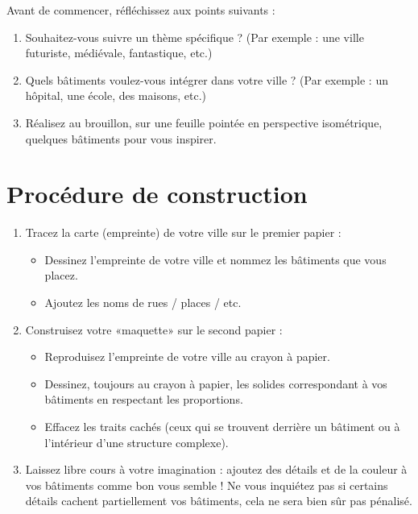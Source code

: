 Avant de commencer, réfléchissez aux points suivants :
\begin{enumerate}
    \item Souhaitez-vous suivre un thème spécifique ? 
    (Par exemple : une ville futuriste, médiévale, fantastique, etc.)
    \item Quels bâtiments voulez-vous intégrer dans votre ville ? 
    (Par exemple : un hôpital, une école, des maisons, etc.)
    \item Réalisez au brouillon, sur une feuille pointée en perspective isométrique, quelques bâtiments pour vous inspirer.
\end{enumerate}

\vspace{-0.5cm}
\section*{Procédure de construction}
\vspace{-0.75cm}

\begin{enumerate}
    \item Tracez la carte (empreinte) de votre ville sur le premier papier :
    
    \begin{itemize}
        \item Dessinez l'empreinte de votre ville et nommez les bâtiments que vous placez.
        \item \bonus Ajoutez les noms de rues / places / etc.
    \end{itemize}
    \item Construisez votre «maquette» sur le second papier :
    
    \begin{itemize}
        \item Reproduisez l'empreinte de votre ville au crayon à papier.
        \item Dessinez, toujours au crayon à papier, les solides correspondant à vos bâtiments en respectant les proportions.
        \item Effacez les traits cachés (ceux qui se trouvent derrière un bâtiment ou à l'intérieur d'une structure complexe).
    \end{itemize}
    \item Laissez libre cours à votre imagination : ajoutez des détails et de la couleur à vos bâtiments comme bon vous semble ! 
    Ne vous inquiétez pas si certains détails cachent partiellement vos bâtiments, cela ne sera bien sûr pas pénalisé.
\end{enumerate}

